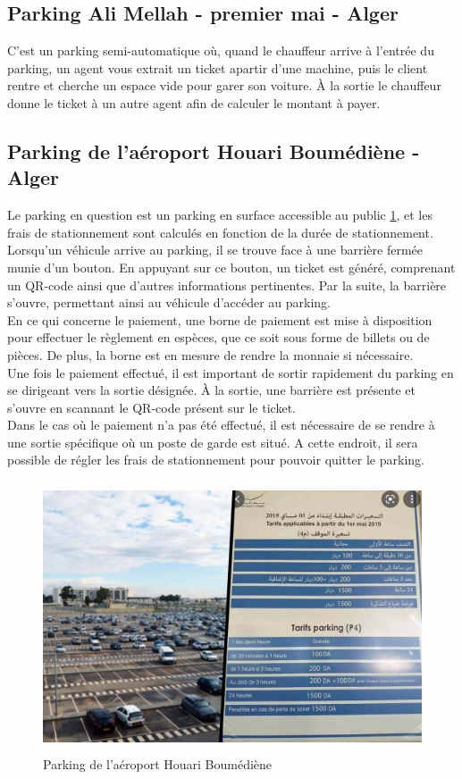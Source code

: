 \subsection{Parking Ali Mellah - premier mai - Alger}
C'est un parking semi-automatique où, quand le chauffeur arrive à l'entrée du parking, un agent vous extrait  un ticket apartir d'une machine, puis le client rentre et cherche un espace vide pour garer son voiture.
À la sortie le chauffeur donne le ticket à un autre agent afin de calculer le montant à payer.

\subsection{Parking de l'aéroport Houari Boumédiène - Alger}
Le parking en question est un parking en surface accessible au public \ref{Boumédiène}, et les frais de stationnement sont calculés en fonction de la durée de stationnement.
\\
Lorsqu'un véhicule arrive au parking, il se trouve face à une barrière fermée munie d'un bouton. En appuyant sur ce bouton, un ticket est généré, comprenant un QR-code ainsi que d'autres informations pertinentes. Par la suite, la barrière s'ouvre, permettant ainsi au véhicule d'accéder au parking.
\\
En ce qui concerne le paiement, une borne de paiement est mise à disposition pour effectuer le règlement en espèces, que ce soit sous forme de billets ou de pièces. De plus, la borne est en mesure de rendre la monnaie si nécessaire.
\\
Une fois le paiement effectué, il est important de sortir rapidement du parking en se dirigeant vers la sortie désignée. À la sortie, une barrière est présente et s'ouvre en scannant le QR-code présent sur le ticket.
\\
Dans le cas où le paiement n'a pas été effectué, il est nécessaire de se rendre à une sortie spécifique où un poste de garde est situé. A cette endroit, il sera possible de régler les frais de stationnement pour pouvoir quitter le parking.
\begin{figure}[H]
	\centering
	\includegraphics[height=08cm]{img/ch2-Parking aéroport à Alger Houari Boumédiène Airport.jpg}
	\caption{Parking de l'aéroport Houari Boumédiène}
 \label{Boumédiène}
\end{figure}
